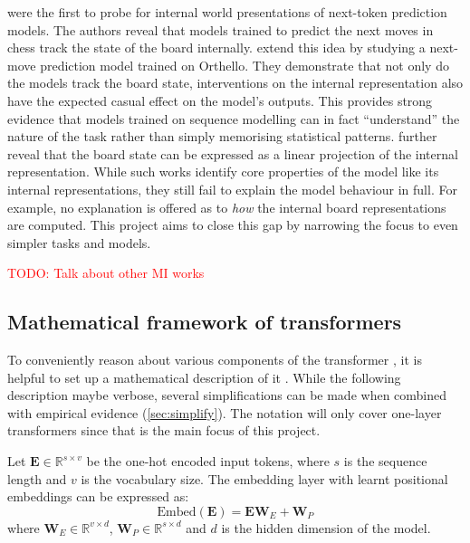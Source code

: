 \documentclass{article}
\newcommand{\todo}[1]{\textcolor{red}{TODO: #1}}
\newcommand{\m}[1]{\mathbf{\bm{#1}}}
\newcommand{\R}{\mathbb{R}}
\begin{document}
\citet{toshniwal2021learning} were the first to probe for internal world presentations of next-token prediction models. The authors reveal that models trained to predict the next moves in chess track the state of the board internally. \citet{orthello-gpt} extend this idea by studying a next-move prediction model trained on Orthello. They demonstrate that not only do the models track the board state, interventions on the internal representation also have the expected casual effect on the model's outputs. This provides strong evidence that models trained on sequence modelling can in fact ``understand'' the nature of the task rather than simply memorising statistical patterns. \citet{linear-orthello-gpt} further reveal that the board state can be expressed as a linear projection of the internal representation. While such works identify core properties of the model like its internal representations, they still fail to explain the model behaviour in full. For example, no explanation is offered as to \emph{how} the internal board representations are computed. This project aims to close this gap by narrowing the focus to even simpler tasks and models.

\todo{Talk about other MI works}

\subsection{Mathematical framework of transformers} \label{sec:math}

To conveniently reason about various components of the transformer \citep{vaswani2017attention}, it is helpful to set up a mathematical description of it \citep{elhage2021mathematical}. While the following description maybe verbose, several simplifications can be made when combined with empirical evidence (\cref{sec:simplify}). The notation will only cover one-layer transformers since that is the main focus of this project.

Let $\m{E} \in \R^{s \times v}$ be the one-hot encoded input tokens, where $s$ is the sequence length and $v$ is the vocabulary size. The embedding layer with learnt positional embeddings can be expressed as:
\begin{equation}  \label{eq:embed}
    \text{Embed}(\m{E}) = \m{E} \m{W}_E + \m{W}_P
\end{equation}
where $\m{W}_E \in \R^{v \times d}$, $\m{W}_P \in \R^{s \times d}$ and $d$ is the hidden dimension of the model.
\end{document}
